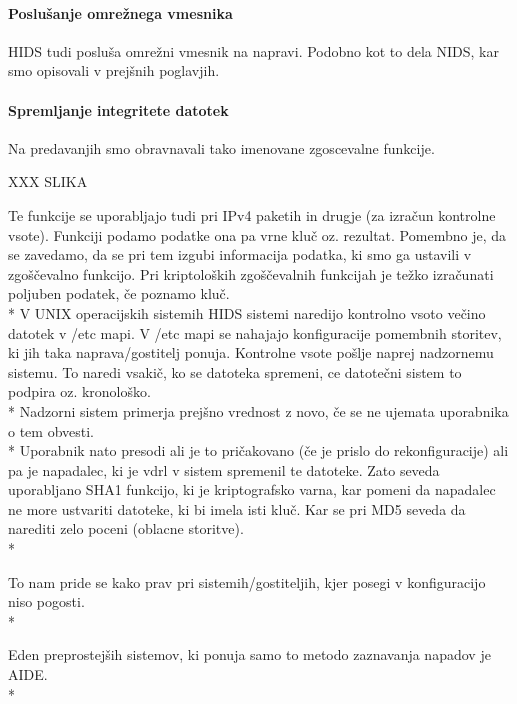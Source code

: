 \documentclass[12pt]{article}
\begin{document}
\paragraph{Poslušanje omrežnega vmesnika} %

HIDS tudi posluša omrežni vmesnik na napravi. 
Podobno kot to dela NIDS, kar smo opisovali v prejšnih poglavjih.


\paragraph{Spremljanje integritete datotek} %

Na predavanjih smo obravnavali tako imenovane zgoscevalne funkcije.

XXX SLIKA

Te funkcije se uporabljajo tudi pri IPv4 paketih in drugje (za izračun kontrolne vsote). Funkciji podamo podatke ona pa vrne kluč oz. rezultat.
Pomembno je, da se zavedamo, da se pri tem izgubi informacija podatka, ki smo ga ustavili v zgoščevalno funkcijo.
Pri kriptoloških zgoščevalnih funkcijah je težko izračunati poljuben podatek, če poznamo kluč.
\\*
V UNIX operacijskih sistemih HIDS sistemi naredijo kontrolno vsoto večino datotek v /etc mapi. V /etc mapi se nahajajo konfiguracije pomembnih storitev, ki jih taka naprava/gostitelj ponuja.
Kontrolne vsote pošlje naprej nadzornemu sistemu. To naredi vsakič, ko se datoteka spremeni, ce datotečni sistem to podpira oz. kronološko.
\\*
Nadzorni sistem primerja prejšno vrednost z novo, če se ne ujemata uporabnika o tem obvesti.
\\*
Uporabnik nato presodi ali je to pričakovano (če je prislo do rekonfiguracije) ali pa je napadalec, ki je vdrl v sistem spremenil te datoteke.
Zato seveda uporabljano SHA1 funkcijo, ki je kriptografsko varna, kar pomeni da napadalec ne more ustvariti datoteke, ki bi imela isti kluč. Kar se pri MD5 seveda da narediti zelo poceni (oblacne storitve).
\\*

To nam pride se kako prav pri sistemih/gostiteljih, kjer posegi v konfiguracijo niso pogosti.
\\*

Eden preprostejših sistemov, ki ponuja samo to metodo zaznavanja napadov je AIDE\cite{aide}.
\\*
\end{document}
